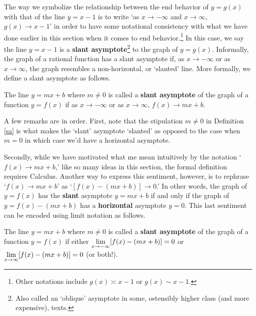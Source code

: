 \documentclass{ximera}
\begin{document}
The way we symbolize the relationship between the end behavior of $y=g(x)$ with that of the line $y=x-1$ is to write `as $x \rightarrow  -\infty$ and $x \rightarrow \infty$, $g(x) \rightarrow x-1$' in order to have some notational consistency with what we have done earlier in this section when it comes to end behavior.\footnote{Other notations include $g(x) \asymp x-1$ or $g(x) \sim x-1$.}  In this case, we say the line $y=x-1$ is a    \textbf{slant asymptote}\footnote{Also called an `oblique' asymptote in some, ostensibly higher class (and more expensive), texts.}  to the graph of $y=g(x)$.  Informally, the graph of a rational function has a slant asymptote if, as $x \rightarrow -\infty$ or as $x \rightarrow \infty$, the graph resembles a non-horizontal, or `slanted' line.  More formally, we define a slant asymptote as follows.


\medskip


\colorbox{ResultColor}{\bbm

\begin{defn} \label{sa} The line $y = mx+b$ where $m \neq 0$  is called a \textbf{slant asymptote} of the graph of a function $y=f(x)$ if as $x \rightarrow -\infty$ or as $x \rightarrow \infty$, $f(x)  \rightarrow mx+b$.


\end{defn}
\ebm}

\medskip


A few remarks are in order.  First, note that the stipulation $m \neq 0$ in Definition \ref{sa} is what makes the `slant' asymptote `slanted' as opposed to the case when $m=0$ in which case we'd have a horizontal asymptote.  

Secondly, while we have motivated what me mean intuitively by the notation `$f(x)  \rightarrow mx+b$,' like so many ideas in this section, the formal definition requires Calculus.  Another way to express this sentiment, however, is to rephrase `$f(x)  \rightarrow mx+b$' as `$[f(x) - (mx+b)] \rightarrow 0$.'  In other words, the graph of $y=f(x)$ has the \textbf{slant} asymptote $y = mx+b$ if and only if the graph of $y = f(x) - (mx+b)$ has a \textbf{horizontal} asymptote $y=0$.   This last sentiment can be encoded using limit notation as follows.

\medskip


\colorbox{ResultColor}{\bbm

\begin{defn} \label{sareprise} The line $y = mx+b$ where $m \neq 0$  is called a \textbf{slant asymptote} of the graph of a function $y=f(x)$ if either $\ds{\lim_{x \rightarrow -\infty} [f(x) - (mx+b)] = 0}$ or $\ds{\lim_{x \rightarrow \infty} [f(x) - (mx+b)] = 0}$ (or both!).

\end{defn}
\ebm}
\end{document}
